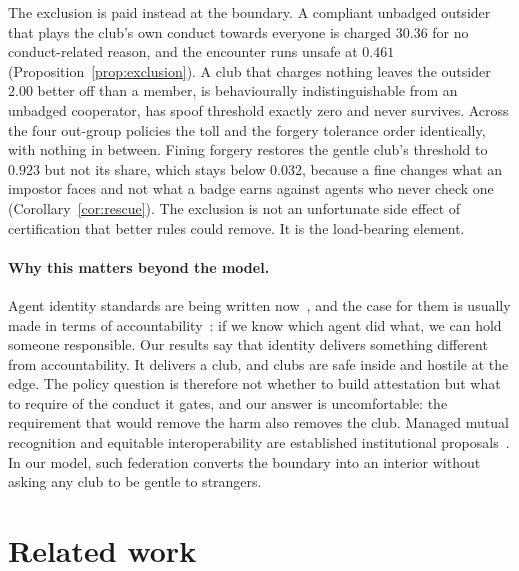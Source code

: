 \documentclass[11pt,a4paper]{article}
\theoremstyle{definition}
\begin{document}
The exclusion is paid instead at the boundary. A compliant unbadged outsider
that plays the club's own conduct towards everyone is charged $30.36$ for no
conduct-related reason, and the encounter runs unsafe at $0.461$
(Proposition~\ref{prop:exclusion}). A club that charges nothing leaves the
outsider $2.00$ better off than a member, is behaviourally indistinguishable
from an unbadged cooperator, has spoof threshold exactly zero and never
survives. Across the four out-group policies the toll and the forgery tolerance
order identically, with nothing in between. Fining forgery restores the gentle
club's threshold to $0.923$ but not its share, which stays below $0.032$,
because a fine changes what an impostor faces and not what a badge earns against
agents who never check one (Corollary~\ref{cor:rescue}). The exclusion is not an
unfortunate side effect of certification that better rules could remove. It is
the load-bearing element.

\paragraph{Why this matters beyond the model.}
Agent identity standards are being written
now~\citep{a2a2026spec,xu2026agentdid,grogan2025agentfacts}, and the case for them is
usually made in terms of accountability~\citep{south2025delegation}: if we know
which agent did what, we can hold someone responsible. Our results say that identity delivers something
different from accountability. It delivers a club, and clubs are safe inside
and hostile at the edge. The policy question is therefore not whether to build
attestation but what to require of the conduct it gates, and our answer is
uncomfortable: the requirement that would remove the harm also removes the
club. Managed mutual recognition and equitable interoperability are established
institutional proposals~\citep{nicolaidis2005transnational,scottmorton2023equitable}.
In our model, such federation converts the boundary into an interior without
asking any club to be gentle to strangers.

\section{Related work}
\label{sec:related}
\end{document}
